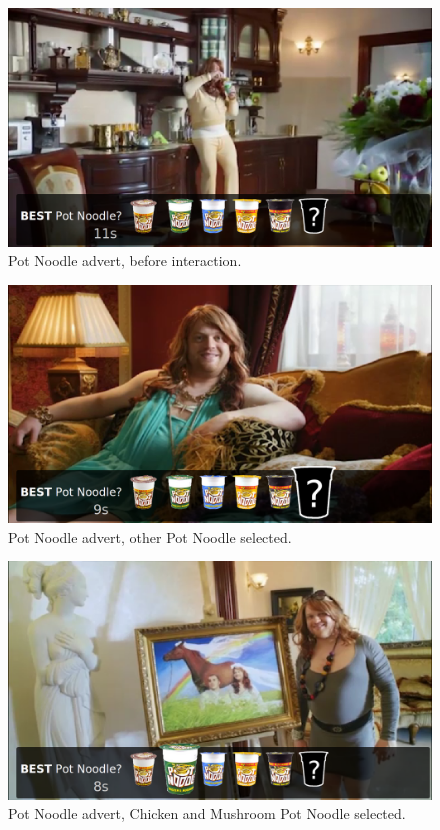 	\begin{figure}[th]
		\centering
		\includegraphics[width=\textwidth,height=0.5\textheight,keepaspectratio]{images/adverts/pot_noodle-1.png}
		\caption{Pot Noodle advert, before interaction.}
		\label{fig:potNoodle1}
	\end{figure}

	\begin{figure}[th]
		\centering
		\includegraphics[width=\textwidth,height=0.5\textheight,keepaspectratio]{images/adverts/pot_noodle-2.png}
		\caption{Pot Noodle advert, other Pot Noodle selected.}
		\label{fig:potNoodle2}
	\end{figure}

	\begin{figure}[th]
		\centering
		\includegraphics[width=\textwidth,height=0.5\textheight,keepaspectratio]{images/adverts/pot_noodle-3.png}
		\caption{Pot Noodle advert, Chicken and Mushroom Pot Noodle selected.}
		\label{fig:potNoodle3}
	\end{figure}

